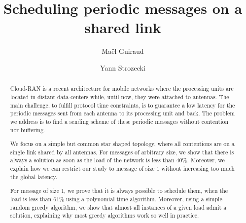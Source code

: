 \documentclass[10pt, conference, letterpaper]{IEEEtran}
\title{Scheduling periodic messages on a shared link}
\author[1,2]{Ma\"el Guiraud}
\author[1]{Yann Strozecki}
\affil[1]{David Laboratory, UVSQ}
\affil[2]{Nokia Bell Labs France}
\begin{document}
\maketitle








\begin{abstract}
Cloud-RAN is a recent architecture for mobile networks where the processing units are located in distant data-centers while, until now, they were attached to antennas. The main challenge, to fulfill protocol time constraints, is to guarantee a low latency for the periodic messages sent from each antenna to its processing unit and back. The problem we address is to find a sending scheme of these periodic messages without contention nor buffering.

We focus on a simple but common star shaped topology, where all contentions are on a single link shared by all antennas. For messages of arbitrary size, we show that there is always a solution as soon as the load of the network is less than $40\%$. Moreover, we explain how we can restrict our study to message of size $1$ without increasing too much the global latency. 

For message of size $1$, we prove that it is always possible to schedule them, when the load is less than $61\%$  using a polynomial time algorithm. Moreover, using a simple random greedy algorithm, we show that almost all instances of a given load admit a solution, explaining why most greedy algorithms work so well in practice.  
\end{abstract}
\end{document}
